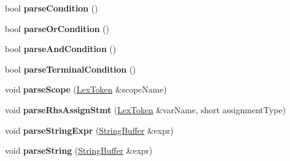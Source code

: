 \begin{DoxyCompactItemize}
\item 
\hypertarget{classCONFIG4CPP__NAMESPACE_1_1ConfigParser_a3f8779c96cc188c9665a180d62c50350}{bool {\bfseries parse\-Condition} ()}\label{classCONFIG4CPP__NAMESPACE_1_1ConfigParser_a3f8779c96cc188c9665a180d62c50350}

\item 
\hypertarget{classCONFIG4CPP__NAMESPACE_1_1ConfigParser_a9a957643b9bc9f9d7dfd32e6cbaef88d}{bool {\bfseries parse\-Or\-Condition} ()}\label{classCONFIG4CPP__NAMESPACE_1_1ConfigParser_a9a957643b9bc9f9d7dfd32e6cbaef88d}

\item 
\hypertarget{classCONFIG4CPP__NAMESPACE_1_1ConfigParser_ae9db19b13ea66f280fcd12e81bb09378}{bool {\bfseries parse\-And\-Condition} ()}\label{classCONFIG4CPP__NAMESPACE_1_1ConfigParser_ae9db19b13ea66f280fcd12e81bb09378}

\item 
\hypertarget{classCONFIG4CPP__NAMESPACE_1_1ConfigParser_ad1f02197a52ffe992cf140bddff335ca}{bool {\bfseries parse\-Terminal\-Condition} ()}\label{classCONFIG4CPP__NAMESPACE_1_1ConfigParser_ad1f02197a52ffe992cf140bddff335ca}

\item 
\hypertarget{classCONFIG4CPP__NAMESPACE_1_1ConfigParser_a4377ccf82778184d5c9795fc35ba883c}{void {\bfseries parse\-Scope} (\hyperlink{classCONFIG4CPP__NAMESPACE_1_1LexToken}{Lex\-Token} \&scope\-Name)}\label{classCONFIG4CPP__NAMESPACE_1_1ConfigParser_a4377ccf82778184d5c9795fc35ba883c}

\item 
\hypertarget{classCONFIG4CPP__NAMESPACE_1_1ConfigParser_a6f75e8eb8c30bb26d41da9044e22aefd}{void {\bfseries parse\-Rhs\-Assign\-Stmt} (\hyperlink{classCONFIG4CPP__NAMESPACE_1_1LexToken}{Lex\-Token} \&var\-Name, short assignment\-Type)}\label{classCONFIG4CPP__NAMESPACE_1_1ConfigParser_a6f75e8eb8c30bb26d41da9044e22aefd}

\item 
\hypertarget{classCONFIG4CPP__NAMESPACE_1_1ConfigParser_a65edbff9a96b90e1726f7e52c84ab9ff}{void {\bfseries parse\-String\-Expr} (\hyperlink{classCONFIG4CPP__NAMESPACE_1_1StringBuffer}{String\-Buffer} \&expr)}\label{classCONFIG4CPP__NAMESPACE_1_1ConfigParser_a65edbff9a96b90e1726f7e52c84ab9ff}

\item 
\hypertarget{classCONFIG4CPP__NAMESPACE_1_1ConfigParser_a2e2cc8642bf15a9211ade425201e7980}{void {\bfseries parse\-String} (\hyperlink{classCONFIG4CPP__NAMESPACE_1_1StringBuffer}{String\-Buffer} \&expr)}\label{classCONFIG4CPP__NAMESPACE_1_1ConfigParser_a2e2cc8642bf15a9211ade425201e7980}


\end{DoxyCompactItemize}
